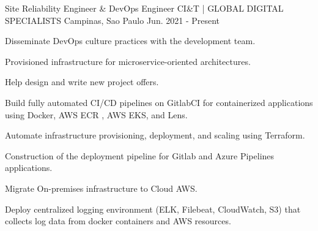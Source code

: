 

\begin{cventries}

  \cventry
    {Site Reliability Engineer \& DevOps Engineer} %
    {CI\&T | GLOBAL DIGITAL SPECIALISTS} %
    {Campinas, Sao Paulo} %
    {Jun. 2021 - Present} %
    {
      \begin{cvitems} %
        \item {Disseminate DevOps culture practices with the development team.}
        \item {Provisioned infrastructure for microservice-oriented architectures.}
        \item {Help design and write new project offers.}
        \item {Build fully automated CI/CD pipelines on GitlabCI for containerized applications using Docker, AWS ECR , AWS EKS, and Lens.}
        \item {Automate infrastructure provisioning, deployment, and scaling using Terraform.}
        \item {Construction of the deployment pipeline for Gitlab and Azure Pipelines applications.}
        \item {Migrate On-premises infrastructure to Cloud AWS.}
        \item {Deploy centralized logging environment (ELK, Filebeat, CloudWatch, S3) that collects log data from docker containers and AWS resources.}
      \end{cvitems}
    }
\break


\end{cventries}
